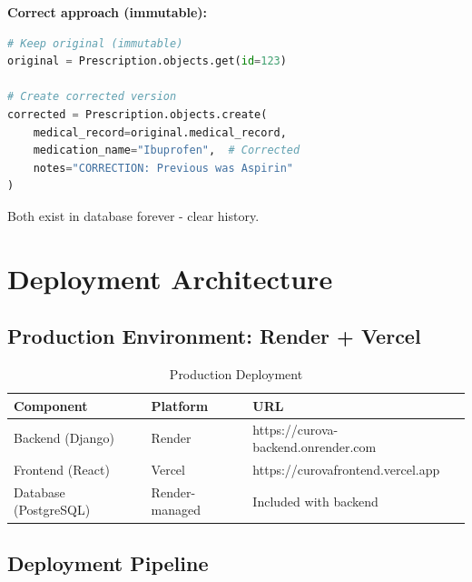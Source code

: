 \documentclass[11pt,a4paper,twoside]{report}
\begin{document}
\textbf{Correct approach (immutable):}

\begin{lstlisting}[language=Python]
# Keep original (immutable)
original = Prescription.objects.get(id=123)

# Create corrected version
corrected = Prescription.objects.create(
    medical_record=original.medical_record,
    medication_name="Ibuprofen",  # Corrected
    notes="CORRECTION: Previous was Aspirin"
)
\end{lstlisting}

Both exist in database forever - clear history.

\newpage

\chapter{Deployment Architecture}

\section{Production Environment: Render + Vercel}

\begin{table}[H]
\centering
\begin{tabular}{|l|l|l|}
\hline
\textbf{Component} & \textbf{Platform} & \textbf{URL} \\
\hline
Backend (Django) & Render & https://curova-backend.onrender.com \\
\hline
Frontend (React) & Vercel & https://curovafrontend.vercel.app \\
\hline
Database (PostgreSQL) & Render-managed & Included with backend \\
\hline
\end{tabular}
\caption{Production Deployment}
\end{table}

\section{Deployment Pipeline}
\end{document}
